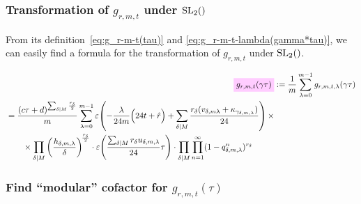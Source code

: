 \documentclass{article}
\begin{document}
\subsubsection{Transformation of $g_{r,m,t}$ under $\SL2Z$}

From its definition~\eqref{eq:g_r-m-t(tau)}
and \ref{eq:g_r-m-t-lambda(gamma*tau)}, we can easily find a formula
for the transformation of $g_{r,m,t}$ under $\SL2Z$.

\begin{align}
  \defineNotation[g-r-m-t-gamma-tau]{g_{r,m,t}(\gamma\tau)}
  &:=\frac{1}{m} \sum_{\lambda=0}^{m-1} g_{r,m,t,\lambda}(\gamma\tau)\notag\\
  \begin{split}
  &=
    \frac{(c\tau+d)^{\divisorsum{M} \frac{r_\delta}{2}}}{m}
    \sum_{\lambda=0}^{m-1}
    \unityPower{-\frac{\lambda}{24m}\Bigl(24t+\sumdelta{r}\Bigr)
    + \divisorsum{M}\frac{r_\delta(v_{\delta,m\lambda} +
    \kappa_{\gamma_{\delta,m,\lambda}})}{24}} \times\\
  & \qquad\times
    \divisorprod{M}
    \left(\frac{h_{\delta,m,\lambda}}{\delta}\right)^{\!\frac{r_\delta}{2}}
    \cdot
    \unityPower{\frac{\divisorsum{M} r_\delta u_{\delta,m,\lambda}}{24}\tau}
    \cdot
    \divisorprod{M}
    \prod_{n=1}^\infty (1-q_{\delta,m,\lambda}^n)^{r_\delta}
  \end{split}
  \label{eq:g_r-m-t(gamma*tau)}
\end{align}

\subsubsection{Find ``modular'' cofactor for $g_{r,m,t}(\tau)$}
\end{document}
